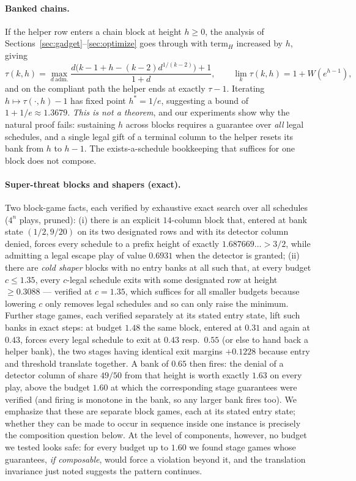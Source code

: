 \documentclass[11pt]{article}
\theoremstyle{definition}
\newcommand{\W}{W}
\begin{document}
\paragraph{Banked chains.}
If the helper row enters a chain block at height $h\ge0$, the analysis of
Sections~\ref{sec:gadget}--\ref{sec:optimize} goes through with
$\mathrm{term}_H$ increased by $h$, giving
\[
 \tau(k,h)=\max_{d\ \mathrm{adm.}}
 \frac{d\bigl(k-1+h-(k-2)d^{1/(k-2)}\bigr)+1}{1+d},
 \qquad
 \lim_k\tau(k,h)=1+\W(e^{h-1}),
\]
and on the compliant path the helper ends at exactly $\tau-1$.  Iterating
$h\mapsto\tau(\cdot,h)-1$ has fixed point $h^*=1/e$, suggesting a bound of
$1+1/e\approx1.3679$.  \emph{This is not a theorem}, and our experiments
show why the natural proof fails: sustaining $h$ across blocks requires a
guarantee over \emph{all} legal schedules, and a single legal gift of a
terminal column to the helper resets its bank from $h$ to $h-1$.  The
exists-a-schedule bookkeeping that suffices for one block does not
compose.

\paragraph{Super-threat blocks and shapers (exact).}
Two block-game facts, each verified by exhaustive exact search over all
schedules ($4^n$ plays, pruned):
(i) there is an explicit $14$-column block that, entered at bank state
$(1/2,9/20)$ on its two designated rows and with its detector column
denied, forces every schedule to a prefix height of exactly
$1.687669\ldots>3/2$, while admitting a legal escape play of value
$0.6931$ when the detector is granted;
(ii) there are \emph{cold shaper} blocks with no entry banks at all such
that, at every budget $c\le1.35$, every $c$-legal schedule exits with
some designated row at height $\ge0.3088$ --- verified at $c=1.35$, which
suffices for all smaller budgets because lowering $c$ only removes legal
schedules and so can only raise the minimum.  Further stage games, each
verified separately at its stated entry state, lift such banks in exact
steps: at budget $1.48$ the same block, entered at $0.31$ and again at
$0.43$, forces every legal schedule to exit at $0.43$ resp.\ $0.55$ (or
else to hand back a helper bank), the two stages having identical exit
margins $+0.1228$ because entry and threshold translate together.  A bank
of $0.65$ then fires: the denial of a detector column of share $49/50$
from that height is worth exactly $1.63$ on every play, above the budget
$1.60$ at which the corresponding stage guarantees were verified (and
firing is monotone in the bank, so any larger bank fires too).  We
emphasize that these are separate block games, each at its stated entry
state; whether they can be made to occur in sequence inside one instance
is precisely the composition question below.  At the level of components,
however, no budget we tested looks safe: for every budget up to $1.60$ we
found stage games whose guarantees, \emph{if composable}, would force a
violation beyond it, and the translation invariance just noted suggests
the pattern continues.
\end{document}
